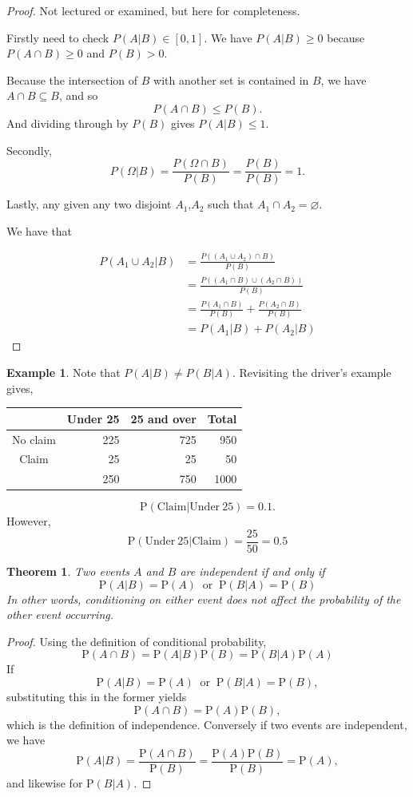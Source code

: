 \documentclass[
]{book}
\newtheorem{theorem}{Theorem}[chapter]
\theoremstyle{definition}
\theoremstyle{definition}
\newtheorem{example}{Example}[chapter]
\theoremstyle{definition}
\theoremstyle{definition}
\theoremstyle{remark}
\begin{document}
\begin{proof}
Not lectured or examined, but here for completeness.

Firstly need to check \(P(A|B)\in[0,1]\). We have \(P(A|B) \geq 0\) because \(P(A\cap B)\geq0\) and \(P(B)>0\).

Because the intersection of \(B\) with another set is contained in \(B\), we have \(A\cap B \subseteq B\), and so
\[P(A\cap B) \leq P(B).\]
And dividing through by \(P(B)\) gives \(P(A|B) \leq 1\).

Secondly, \[P(\Omega|B) = \frac{P(\Omega \cap B)}{P(B)} = \frac{P(B)}{P(B)}=1.\]

Lastly, any given any two disjoint \(A_1\),\(A_2\) such that \(A_1\cap A_2 = \varnothing\).

We have that

\begin{align}
P(A_1\cup A_2 |B) &= \frac{P((A_1\cup A_2)\cap B)}{P(B)} \\
&= \frac{P((A_1\cap B)\cup (A_2\cap B))}{P(B)} \\
&= \frac{P(A_1\cap B)}{P(B)} + \frac{P(A_2\cap B)}{P(B)} \\
&= P(A_1|B) + P(A_2|B)
\end{align}
\end{proof}

\begin{example}
Note that \(P(A|B) \neq P(B|A)\). Revisiting the driver's example gives,

\begin{longtable}[]{@{}crrr@{}}
\toprule
& Under 25 & 25 and over & Total\tabularnewline
\midrule
\endhead
No claim & 225 & 725 & 950\tabularnewline
Claim & 25 & 25 & 50\tabularnewline
& 250 & 750 & 1000\tabularnewline
\bottomrule
\end{longtable}

\[\text{P}(\text{Claim}|\text{Under}\ 25)=0.1.\]
However,
\[\text{P}(\text{Under}\ 25|\text{Claim})=\frac{25}{50} = 0.5\]
\end{example}

\begin{theorem}
Two events \(A\) and \(B\) are \emph{independent} if and only if
\[\text{P}(A|B) = \text{P}(A) \ \text{ or } \ \text{P}(B|A) = \text{P}(B)\]
In other words, conditioning on either event does not affect the probability of the other event occurring.
\end{theorem}

\begin{proof}
Using the definition of conditional probability,
\[\text{P}(A\cap B) = \text{P}(A|B)\text{P}(B)=\text{P}(B|A)\text{P}(A)\]
If
\[\text{P}(A|B) = \text{P}(A) \ \text{ or } \ \text{P}(B|A) = \text{P}(B),\]
substituting this in the former yields
\[\text{P}(A\cap B) = \text{P}(A)\text{P}(B), \]
which is the definition of independence.
Conversely if two events are independent, we have
\[\text{P}(A|B) = \frac{\text{P}(A\cap B)}{\text{P}(B)} = \frac{\text{P}(A)\text{P}(B)}{\text{P}(B)} = \text{P}(A), \]
and likewise for \(\text{P}(B|A)\).
\end{proof}
\end{document}

